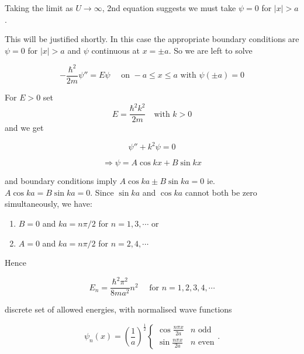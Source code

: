 \documentclass[a4paper]{article}
\begin{document}
Taking the limit as $ U  \to \infty $, 2nd equation suggests we must take $ \psi = 0 $ for $ | x | > a $.

This will be justified shortly. In this case the appropriate boundary conditions are $ \psi = 0 $ for $ | x | > a $ and $ \psi $ continuous at $ x = \pm a $. So we are left to solve

\[ - \frac{\hbar^{2}}{2m} \psi'' = E \psi \quad \text{ on } -a \leq x \leq a  \text{ with } \psi(\pm a) = 0 \]

For $ E > 0 $ set \[  E = \frac{\hbar^{2} k^{2}}{2m}  \quad \text{with } k > 0 \] and we get

\[ \psi'' + k^{2} \psi = 0 \]

\[ \Rightarrow \psi = A \cos k x + B \sin k x \]

and boundary conditions imply $ A \cos k a \pm B \sin k a  = 0 $ ie.  $ A \cos k a = B \sin k a  = 0 $.
Since $ \sin ka $ and $ \cos ka $ cannot both be zero simultaneously, we have:


\begin{enumerate}
	\item $ B = 0 $ and $ ka = n \pi / 2 $ for $ n = 1,3,\cdots $
or 
\item $ A = 0 $ and $ ka = n \pi / 2 $ for $ n = 2,4,\cdots $
	
\end{enumerate}

Hence

\[ E_{n} = \frac{\hbar^{2}\pi^{2}}{8ma^{2}}n^{2} \quad \text{ for } n = 1,2,3,4,\cdots \]

discrete set of allowed energies, with normalised wave functions

\[
\psi_n(x) = \left(\frac{1}{a}\right)^{\frac{1}{2}}
\begin{cases}
\cos \frac{n\pi x}{2a} & n\text{ odd}\\
\sin \frac{n\pi x}{2a} & n\text{ even}
\end{cases}.
\]




  
\end{document}

